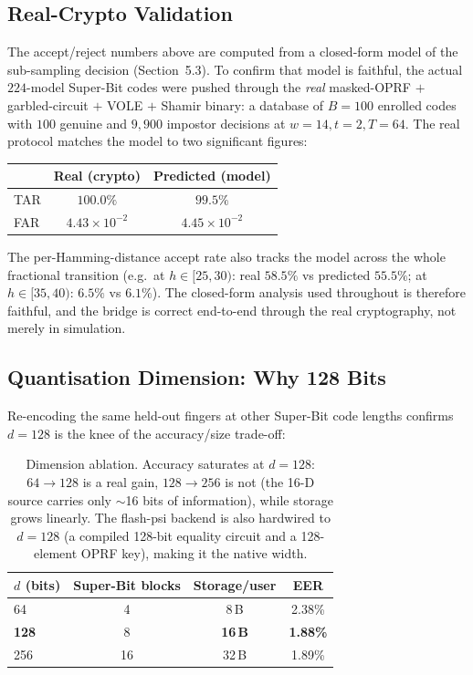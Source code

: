 \documentclass[11pt]{article}
\begin{document}
\subsection{Real-Crypto Validation}

The accept/reject numbers above are computed from a closed-form model of the sub-sampling
decision (Section~5.3). To confirm that model is faithful, the actual $224$-model Super-Bit codes
were pushed through the \emph{real} masked-OPRF $+$ garbled-circuit $+$ VOLE $+$ Shamir binary: a
database of $B=100$ enrolled codes with $100$ genuine and $9{,}900$ impostor decisions at
$w=14, t=2, T=64$. The real protocol matches the model to two significant figures:

\begin{center}
\begin{tabular}{lcc}
\toprule
 & Real (crypto) & Predicted (model) \\
\midrule
TAR & $100.0\%$ & $99.5\%$ \\
FAR & $4.43\times10^{-2}$ & $4.45\times10^{-2}$ \\
\bottomrule
\end{tabular}
\end{center}

The per-Hamming-distance accept rate also tracks the model across the whole fractional transition
(e.g.\ at $h\in[25,30)$: real $58.5\%$ vs predicted $55.5\%$; at $h\in[35,40)$: $6.5\%$ vs
$6.1\%$). The closed-form analysis used throughout is therefore faithful, and the bridge is
correct end-to-end through the real cryptography, not merely in simulation.

\subsection{Quantisation Dimension: Why 128 Bits}

Re-encoding the same held-out fingers at other Super-Bit code lengths confirms $d=128$ is the knee
of the accuracy/size trade-off:

\begin{table}[h]
\centering
\begin{tabular}{lccc}
\toprule
$d$ (bits) & Super-Bit blocks & Storage/user & EER \\
\midrule
64           & 4  & 8\,B  & 2.38\% \\
\textbf{128} & 8  & \textbf{16\,B} & \textbf{1.88\%} \\
256          & 16 & 32\,B & 1.89\% \\
\bottomrule
\end{tabular}
\caption{Dimension ablation. Accuracy saturates at $d=128$: $64\to128$ is a real gain,
$128\to256$ is not (the 16-D source carries only $\sim$16 bits of information), while storage
grows linearly. The flash-psi backend is also hardwired to $d=128$ (a compiled 128-bit equality
circuit and a 128-element OPRF key), making it the native width.}
\end{table}
\end{document}

